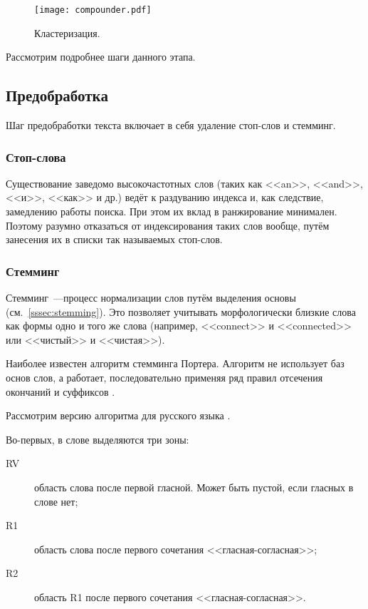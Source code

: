 \begin{figure}[h]
    \centering
    \texttt{[image: compounder.pdf]}
    \caption{Кластеризация.}
    \label{fig:compounder}
\end{figure}

Рассмотрим подробнее шаги данного этапа.

\subsection{Предобработка}
Шаг предобработки текста включает в себя удаление стоп-слов и стемминг.

\subsubsection{Стоп-слова}
Существование заведомо высокочастотных слов (таких как <<an>>, <<and>>, <<и>>, <<как>> и др.) ведёт к раздуванию индекса и, как следствие, замедлению работы поиска. При этом их вклад в ранжирование минимален. Поэтому разумно отказаться от индексирования таких слов вообще, путём занесения их в списки так называемых стоп-слов.

\subsubsection{Стемминг}
Стемминг~---процесс нормализации слов путём выделения основы (см.~\ref{sssec:stemming}). Это позволяет учитывать морфологически близкие слова как формы одно и того же слова (например, <<connect>> и <<connected>> или <<чистый>> и <<чистая>>).

Наиболее известен алгоритм стемминга Портера. Алгоритм не использует баз основ слов, а работает, последовательно применяя ряд правил отсечения окончаний и суффиксов \cite{porter97}.

Рассмотрим версию алгоритма для русского языка \cite{porter06}.

Во-первых, в слове выделяются три зоны:
\begin{description}
    \item[RV] область слова после первой гласной. Может быть пустой, если гласных в слове нет;
    \item[R1] область слова после первого сочетания <<гласная-согласная>>;
    \item[R2] область R1 после первого сочетания <<гласная-согласная>>.
\end{description}

